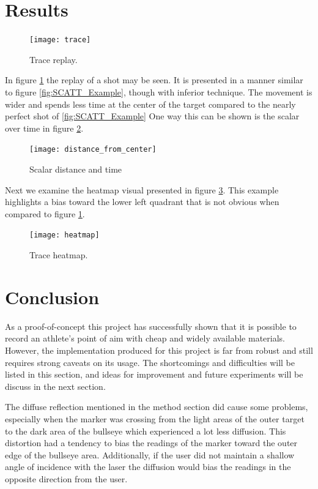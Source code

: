 \documentclass[conference]{IEEEtran}
\begin{document}
\section{Results}

\begin{figure}[]
	\centering
	\texttt{[image: trace]}
	\caption{Trace replay.}
	\label{fig:trace}
\end{figure}

In figure \ref{fig:trace} the replay of a shot may be seen.
It is presented in a manner similar to figure \ref{fig:SCATT_Example}, 
though with inferior technique.
The movement is wider and spends less time at the center of the target compared to the nearly perfect shot of  \ref{fig:SCATT_Example}
One way this can be shown is the scalar over time in figure \ref{fig:dfc}.

\begin{figure}[]
	\centering
	\texttt{[image: distance\_from\_center]}
	\caption{Scalar distance and time}
	\label{fig:dfc}
\end{figure}

Next we examine the heatmap visual presented in figure \ref{fig:heatmap}.
This example highlights a bias toward the lower left quadrant that is not obvious when compared to figure \ref{fig:trace}.


\begin{figure}[]
	\centering
	\texttt{[image: heatmap]}
	\caption{Trace heatmap.}
	\label{fig:heatmap}
\end{figure}









\section{Conclusion}

As a proof-of-concept this project has successfully shown that it is possible to record an athlete's point of aim with cheap and widely available materials.
However, the implementation produced for this project is far from robust and still requires strong caveats on its usage.
The shortcomings and difficulties will be listed in this section, 
and ideas for improvement and future experiments will be discuss in the next section.

The diffuse reflection mentioned in the method section did cause some problems, especially when the marker was crossing from the light areas of the outer target to the dark area of the bullseye which experienced a lot less diffusion.
This distortion had a tendency to bias the readings of the marker toward the outer edge of the bullseye area.
Additionally, if the user did not maintain a shallow angle of incidence with the laser the diffusion would bias the readings in the opposite direction from the user.
\end{document}
